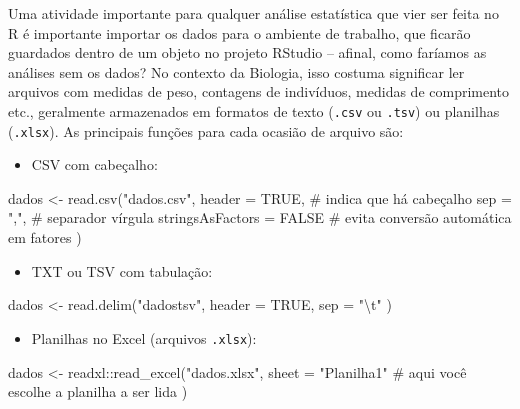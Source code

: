 \documentclass[
  12pt,
  letterpaper,
  DIV=11,
  numbers=noendperiod]{scrreprt}
\newenvironment{Shaded}{\begin{snugshade}}{\end{snugshade}}
\newcommand{\AttributeTok}[1]{\textcolor[rgb]{0.40,0.45,0.13}{#1}}
\newcommand{\CommentTok}[1]{\textcolor[rgb]{0.37,0.37,0.37}{#1}}
\newcommand{\ConstantTok}[1]{\textcolor[rgb]{0.56,0.35,0.01}{#1}}
\newcommand{\FunctionTok}[1]{\textcolor[rgb]{0.28,0.35,0.67}{#1}}
\newcommand{\NormalTok}[1]{\textcolor[rgb]{0.00,0.23,0.31}{#1}}
\newcommand{\OtherTok}[1]{\textcolor[rgb]{0.00,0.23,0.31}{#1}}
\newcommand{\SpecialCharTok}[1]{\textcolor[rgb]{0.37,0.37,0.37}{#1}}
\newcommand{\StringTok}[1]{\textcolor[rgb]{0.13,0.47,0.30}{#1}}
\providecommand{\tightlist}{%
  \setlength{\itemsep}{0pt}\setlength{\parskip}{0pt}}\usepackage{longtable,booktabs,array}
\begin{document}
Uma atividade importante para qualquer análise estatística que vier ser
feita no R é importante importar os dados para o ambiente de trabalho,
que ficarão guardados dentro de um objeto no projeto RStudio -- afinal,
como faríamos as análises sem os dados? No contexto da Biologia, isso
costuma significar ler arquivos com medidas de peso, contagens de
indivíduos, medidas de comprimento etc., geralmente armazenados em
formatos de texto (\texttt{.csv} ou \texttt{.tsv}) ou planilhas
(\texttt{.xlsx}). As principais funções para cada ocasião de arquivo
são:

\begin{itemize}
\tightlist
\item
  CSV com cabeçalho:
\end{itemize}

\begin{Shaded}
\begin{Highlighting}[]
\NormalTok{dados }\OtherTok{\textless{}{-}} \FunctionTok{read.csv}\NormalTok{(}\StringTok{"dados.csv"}\NormalTok{,}
  \AttributeTok{header =} \ConstantTok{TRUE}\NormalTok{, }\CommentTok{\# indica que há cabeçalho}
  \AttributeTok{sep    =} \StringTok{","}\NormalTok{,  }\CommentTok{\# separador vírgula}
  \AttributeTok{stringsAsFactors =} \ConstantTok{FALSE} \CommentTok{\# evita conversão automática em fatores}
\NormalTok{)}
\end{Highlighting}
\end{Shaded}

\begin{itemize}
\tightlist
\item
  TXT ou TSV com tabulação:
\end{itemize}

\begin{Shaded}
\begin{Highlighting}[]
\NormalTok{dados }\OtherTok{\textless{}{-}} \FunctionTok{read.delim}\NormalTok{(}\StringTok{"dadostsv"}\NormalTok{, }
  \AttributeTok{header =} \ConstantTok{TRUE}\NormalTok{, }
  \AttributeTok{sep    =} \StringTok{"}\SpecialCharTok{\textbackslash{}t}\StringTok{"}
\NormalTok{)}
\end{Highlighting}
\end{Shaded}

\begin{itemize}
\tightlist
\item
  Planilhas no Excel (arquivos \texttt{.xlsx}):
\end{itemize}

\begin{Shaded}
\begin{Highlighting}[]
\NormalTok{dados }\OtherTok{\textless{}{-}}\NormalTok{ readxl}\SpecialCharTok{::}\FunctionTok{read\_excel}\NormalTok{(}\StringTok{"dados.xlsx"}\NormalTok{,}
  \AttributeTok{sheet =} \StringTok{"Planilha1"} \CommentTok{\# aqui você escolhe a planilha a ser lida}
\NormalTok{)}
\end{Highlighting}
\end{Shaded}
\end{document}
